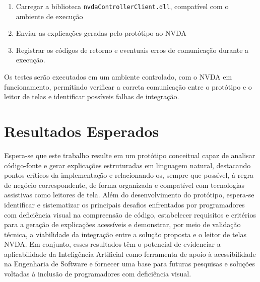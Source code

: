 \documentclass[
    12pt,                   %
    openright,              %
    oneside,                %
    a4paper,                %
    sumario=tradicional,    %
    english,                %
    brazil,                 %
    ]{abntex2}
\begin{document}
\begin{enumerate}
  \item Carregar a biblioteca \texttt{nvdaControllerClient.dll}, compatível com o ambiente de execução
  \item Enviar as explicações geradas pelo protótipo ao NVDA
  \item Registrar os códigos de retorno e eventuais erros de comunicação durante a execução.
\end{enumerate}

Os testes serão executados em um ambiente controlado, com o NVDA em funcionamento, permitindo verificar a correta comunicação entre o protótipo e o leitor de telas e identificar possíveis falhas de integração.


\chapter{Resultados Esperados}\label{sec:resultEsperados}

Espera-se que este trabalho resulte em um protótipo conceitual capaz de analisar código-fonte e gerar explicações estruturadas em linguagem natural, destacando pontos críticos da implementação e relacionando-os, sempre que possível, à regra de negócio correspondente, de forma organizada e compatível com tecnologias assistivas como leitores de tela. Além do desenvolvimento do protótipo, espera-se identificar e sistematizar os principais desafios enfrentados por programadores com deficiência visual na compreensão de código, estabelecer requisitos e critérios para a geração de explicações acessíveis e demonstrar, por meio de validação técnica, a viabilidade da integração entre a solução proposta e o leitor de telas NVDA. Em conjunto, esses resultados têm o potencial de evidenciar a aplicabilidade da Inteligência Artificial como ferramenta de apoio à acessibilidade na Engenharia de Software e fornecer uma base para futuras pesquisas e soluções voltadas à inclusão de programadores com deficiência visual.



\end{document}
